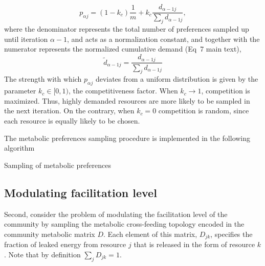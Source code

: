 \documentclass[12pt]{article}
\begin{document}
\begin{equation}\label{eq:sampling_probability_supp}
	p_{{\alpha}j}= (1-k_c) \frac{1}{m}  + k_c \frac{d_{{\alpha} -1j}}{\sum_{j}d_{{\alpha}-1j}},
\end{equation}
where the denominator represents the total number of preferences sampled up until iteration $ {\alpha}-1 $, and acts as a normalization constant, and together with the numerator represents the normalized cumulative demand (Eq~7 main text),
\begin{equation}
    \tilde{d}_{\alpha  -1j} = \frac{d_{{\alpha} -1j}}{\sum_{j}d_{{\alpha}-1j}}
\end{equation}
The strength with which $ p_{{\alpha}j} $ deviates from a uniform distribution is given by the parameter $ k_c \in [0, 1)$, the competitiveness factor. When $ k_c \rightarrow 1 $, competition is maximized. Thus, highly demanded resources are more likely to be sampled in the next iteration. On the contrary, when $ k_c = 0 $ competition is random, since each resource is equally likely to be chosen.

The metabolic preferences sampling procedure is implemented in the following algorithm\\[10pt]
\begin{algorithm}[H]
	\SetAlgoLined
	\caption{Sampling of metabolic preferences}
\end{algorithm}
\vspace{10pt}

\subsection*{Modulating facilitation level}

Second, consider the problem of modulating the facilitation level of the community by sampling the metabolic cross-feeding topology encoded in the community metabolic matrix $ D $. Each element of this matrix, $ D_{jk} $, specifies the fraction of leaked energy from resource $ j $ that is released in the form of resource $ k $. Note that by definition $ \sum_jD_{jk} = 1 $.
\end{document}
